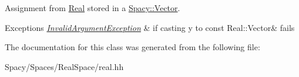 Assignment from \hyperlink{classSpacy_1_1Real}{Real} stored in a \hyperlink{classSpacy_1_1Vector}{Spacy\+::\+Vector}. 


\begin{DoxyExceptions}{Exceptions}
{\em \hyperlink{classSpacy_1_1InvalidArgumentException}{Invalid\+Argument\+Exception}} & if casting y to const Real\+::\+Vector\& fails \\
\hline
\end{DoxyExceptions}


The documentation for this class was generated from the following file\+:\begin{DoxyCompactItemize}
\item 
Spacy/\+Spaces/\+Real\+Space/real.\+hh\end{DoxyCompactItemize}
